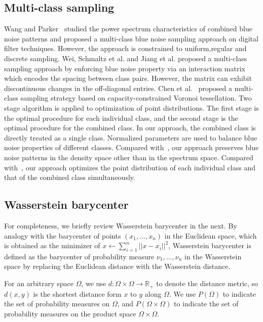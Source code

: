 \subsection{Multi-class sampling}
Wang and Parker~ studied the power spectrum characteristics of combined blue noise patterns and proposed a multi-class blue noise sampling approach on digital filter techniques.
However, the approach is constrained to uniform,regular and discrete sampling.
Wei, Schmaltz et al. and Jiang et al. proposed a multi-class sampling
approach by enforcing blue noise property via an interaction matrix which
encodes the spacing between class pairs.
However, the matrix can exhibit discontinuous changes in the off-diagonal entries.
Chen et al.~ proposed a multi-class sampling strategy based on capacity-constrained Voronoi tessellation.
Two stage algorithm
 is applied to optimization of point distributions.
The first stage is the optimal procedure for each individual class,
and the second stage is the optimal procedure for the combined class.
In our approach,
the combined class is directly treated as a single class.
Normalized parameters are used to balance blue noise properties of different classes.
Compared with~\cite{Wang:1999:BlueNoise},
our approach preserves blue noise patterns in the density space other than in the spectrum space.
Compared with~\cite{chen:2012:variational},
our approach optimizes the point distribution of each individual class and that of the combined class simultaneously.


\subsection{Wasserstein barycenter}
For completeness, we briefly review Wasserstein barycenter in the next.
By analogy with the barycenter of points $(x_1,...,x_n)$ in the Euclidean space, which is obtained as the minimizer of $x\leftarrow\sum_{i=1}^n||x-x_i||^2$,
Wasserstein barycenter is defined as the barycenter of probability measure $\nu_1,...,\nu_n$ in the Wasserstein space
by replacing the Euclidean distance with the Wasserstein distance.

For an arbitrary space $\Omega$,
we use $d:\Omega\times\Omega\rightarrow{\mathbb{R}}_+$ to denote the distance metric,
so $d(x,y)$ is the shortest distance form $x$ to $y$ along $\Omega$.
We use $P(\Omega)$ to indicate the set of probability measures on $\Omega$,
and $P(\Omega\times\Omega)$ to indicate the set of probability measures on the product space $\Omega\times\Omega$.

